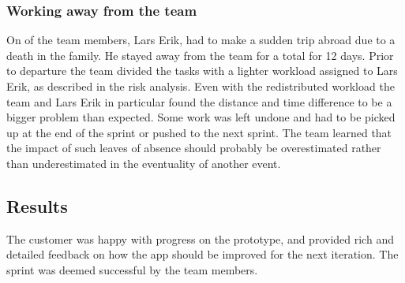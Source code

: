 \subsubsection{Working away from the team}
On of the team members, Lars Erik, had to make a sudden trip abroad due to a death in the family. He stayed away from the team for a total for 12 days. Prior to departure the team divided the tasks with a lighter workload assigned to Lars Erik, as described in the risk analysis. Even with the redistributed workload the team and Lars Erik in particular found the distance and time difference to be a bigger problem than expected. Some work was left undone and had to be picked up at the end of the sprint or pushed to the next sprint. The team learned that the impact of such leaves of absence should probably be overestimated rather than underestimated in the eventuality of another event.

\subsection{Results}
The customer was happy with progress on the prototype, and provided rich and detailed feedback on how the app should be improved for the next iteration. The sprint was deemed successful by the team members.